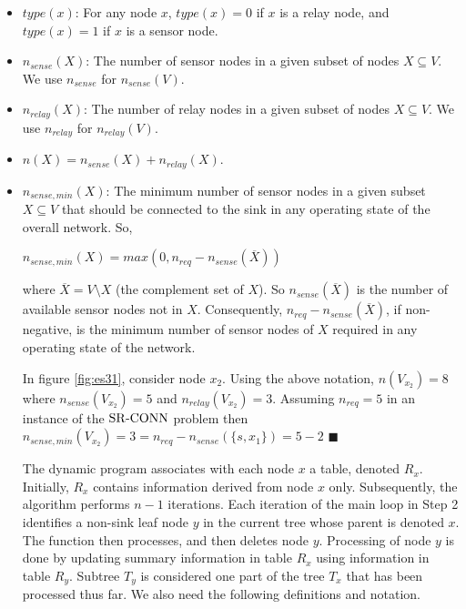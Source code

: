 \begin{itemize}[noitemsep]
\item	$type(x)$:
	For any node $x$, $type(x)= 0$ if $x$ is a relay node,
	and $type(x)= 1$ if $x$ is a sensor node.

\item	$n_{sense}(X)$: The number of sensor nodes in a given subset  of nodes $X\subseteq V$. We use $n_{sense}$ for $n_{sense}(V)$.


\item   $n_{relay}(X)$: The number of relay nodes in a given subset of nodes $X\subseteq V$. We use $n_{relay}$ for $n_{relay}(V)$.

\item $n(X)=n_{sense}(X) + n_{relay}(X)$.

\item $n_{sense,min}(X)$: The minimum number of sensor nodes in a given subset $X\subseteq V$ that should be connected to the sink in any operating state of the overall network. So,\\
\centerline{
$n_{sense,min}(X)=max(0,n_{req}-n_{sense}(\overline{X}))$
}

\nwline
where $\overline{X}=V\setminus X$ (the complement set of $X$). So $n_{sense}(\overline{X})$ is the number of available sensor nodes not in $X$. Consequently, $n_{req}-n_{sense}(\overline{X})$, if non-negative, is the minimum number of sensor nodes of $X$ required in any operating state of the network. 

\begin{example}
\normalfont
In figure \ref{fig:es31}, consider node $x_2$. Using the above notation, $n(V_{x_2})=8$ where $n_{sense}(V_{x_2})=5$ and $n_{relay}(V_{x_2})=3$. Assuming $n_{req}=5$ in an instance of the ${\mathrm {SR\mbox{-}CONN}}$ problem then $n_{sense,min}(V_{x_2})=3=n_{req}-n_{sense}(\{s,x_1\})=5-2$ $\blacksquare$
\end{example}
The dynamic program associates with each node $x$ a table, denoted $R_x$. Initially, $R_x$ contains information derived from node $x$ only. Subsequently, the algorithm performs $n-1$ iterations. Each iteration of the main loop in Step 2 identifies
	a non-sink leaf node $y$ in the current tree whose parent is denoted $x$. 
	The function then processes, and then deletes node $y$. Processing of node $y$ is done by updating summary information in table $R_x$ using information in table $R_y$. Subtree $T_y$ is considered one part of the tree $T_x$ that has been processed thus far. We also need the following definitions and notation.


\end{itemize}
